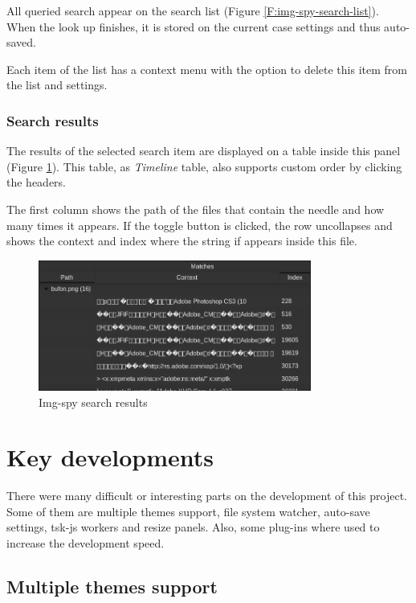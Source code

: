 All queried search appear on the search list (Figure
\ref{F:img-spy-search-list}). When the look up finishes, it is stored on the
current case settings and thus auto-saved.

Each item of the list has a context menu with the option to delete this item
from the list and settings.

\subsubsection{Search results}

The results of the selected search item are displayed on a table inside this
panel (Figure \ref{F:img-spy-search-results}). This table, as \textit{Timeline}
table, also supports custom order by clicking the headers.

The first column shows the path of the files that contain the needle and 
how many times it appears. If the toggle button is clicked, the row
uncollapses and shows the context and index where the string if appears inside
this file.

\begin{figure}[htb]
	\begin{center}
		\includegraphics[width=0.8\textwidth]
		{./figures/search-results.png}
		\caption{Img-spy search results}
		\label{F:img-spy-search-results}
	\end{center}
\end{figure}

\section{Key developments}

There were many difficult or interesting parts on the development of this 
project. Some of them are multiple themes support, file system watcher, 
auto-save settings, tsk-js workers and resize panels. Also, some plug-ins where
used to increase the development speed.

\subsection{Multiple themes support}


